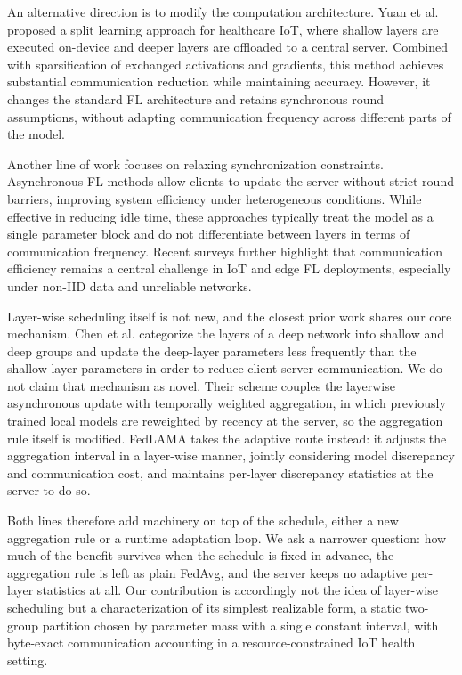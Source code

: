 \documentclass[10pt,conference]{IEEEtran}
\begin{document}
An alternative direction is to modify the computation architecture. Yuan et al. \cite{yuan2020} proposed a split learning approach for healthcare IoT, where shallow layers are executed on-device and deeper layers are offloaded to a central server. Combined with sparsification of exchanged activations and gradients, this method achieves substantial communication reduction while maintaining accuracy. However, it changes the standard FL architecture and retains synchronous round assumptions, without adapting communication frequency across different parts of the model.

Another line of work focuses on relaxing synchronization constraints. Asynchronous FL methods \cite{xie2019asynchronous} allow clients to update the server without strict round barriers, improving system efficiency under heterogeneous conditions. While effective in reducing idle time, these approaches typically treat the model as a single parameter block and do not differentiate between layers in terms of communication frequency. Recent surveys \cite{tariq2024} further highlight that communication efficiency remains a central challenge in IoT and edge FL deployments, especially under non-IID data and unreliable networks.

Layer-wise scheduling itself is not new, and the closest prior work shares our core mechanism. Chen et al. \cite{chen2020layerwise} categorize the layers of a deep network into shallow and deep groups and update the deep-layer parameters less frequently than the shallow-layer parameters in order to reduce client-server communication. We do not claim that mechanism as novel. Their scheme couples the layerwise asynchronous update with temporally weighted aggregation, in which previously trained local models are reweighted by recency at the server, so the aggregation rule itself is modified. FedLAMA \cite{xu2021layerwise} takes the adaptive route instead: it adjusts the aggregation interval in a layer-wise manner, jointly considering model discrepancy and communication cost, and maintains per-layer discrepancy statistics at the server to do so.

Both lines therefore add machinery on top of the schedule, either a new aggregation rule or a runtime adaptation loop. We ask a narrower question: how much of the benefit survives when the schedule is fixed in advance, the aggregation rule is left as plain FedAvg, and the server keeps no adaptive per-layer statistics at all. Our contribution is accordingly not the idea of layer-wise scheduling but a characterization of its simplest realizable form, a static two-group partition chosen by parameter mass with a single constant interval, with byte-exact communication accounting in a resource-constrained IoT health setting.
\end{document}

